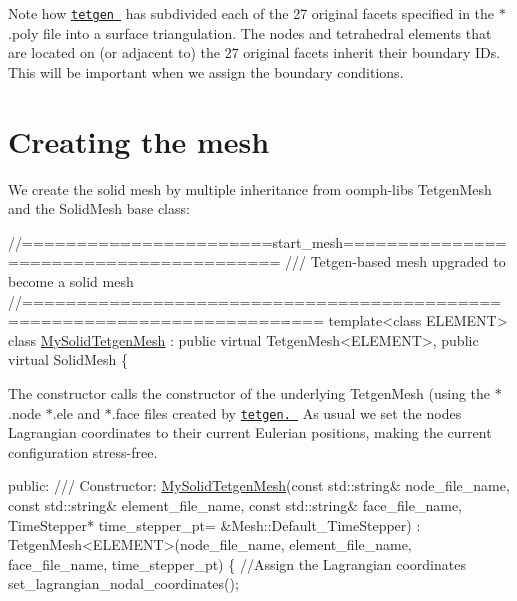 Note how \href{http://wias-berlin.de/software/tetgen//}{\tt {\ttfamily tetgen} } has subdivided each of the 27 original facets specified in the {\ttfamily $\ast$.poly} file into a surface triangulation. The nodes and tetrahedral elements that are located on (or adjacent to) the 27 original facets inherit their boundary I\+Ds. This will be important when we assign the boundary conditions.



 

\hypertarget{index_mesh_code}{}\section{Creating the mesh}\label{index_mesh_code}
We create the solid mesh by multiple inheritance from {\ttfamily oomph-\/lib\textquotesingle{}s} {\ttfamily Tetgen\+Mesh} and the {\ttfamily Solid\+Mesh} base class\+:

 
\begin{DoxyCodeInclude}
\textcolor{comment}{//=======================start\_mesh========================================}
\textcolor{comment}{/// Tetgen-based mesh upgraded to become a solid mesh}
\textcolor{comment}{}\textcolor{comment}{//=========================================================================}
\textcolor{keyword}{template}<\textcolor{keyword}{class} ELEMENT>
\textcolor{keyword}{class }\hyperlink{classMySolidTetgenMesh}{MySolidTetgenMesh} : \textcolor{keyword}{public} \textcolor{keyword}{virtual} TetgenMesh<ELEMENT>, 
                       \textcolor{keyword}{public} \textcolor{keyword}{virtual} SolidMesh 
\{

\end{DoxyCodeInclude}


The constructor calls the constructor of the underlying {\ttfamily Tetgen\+Mesh} (using the {\ttfamily $\ast$.node } {\ttfamily $\ast$.ele} and {\ttfamily $\ast$.face} files created by \href{http://wias-berlin.de/software/tetgen//}{\tt {\ttfamily tetgen}. } As usual we set the nodes\textquotesingle{} Lagrangian coordinates to their current Eulerian positions, making the current configuration stress-\/free.


\begin{DoxyCodeInclude}
 
\textcolor{keyword}{public}:
 \textcolor{comment}{}
\textcolor{comment}{ /// Constructor: }
\textcolor{comment}{} \hyperlink{classMySolidTetgenMesh}{MySolidTetgenMesh}(\textcolor{keyword}{const} std::string& node\_file\_name,
                \textcolor{keyword}{const} std::string& element\_file\_name,
                \textcolor{keyword}{const} std::string& face\_file\_name,
                TimeStepper* time\_stepper\_pt=
                &Mesh::Default\_TimeStepper) : 
  TetgenMesh<ELEMENT>(node\_file\_name, element\_file\_name,
                      face\_file\_name, time\_stepper\_pt)
  \{
   \textcolor{comment}{//Assign the Lagrangian coordinates}
   set\_lagrangian\_nodal\_coordinates();

\end{DoxyCodeInclude}


